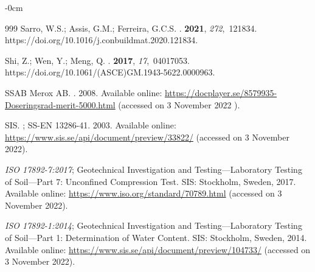 \documentclass[materials,article,accept,pdftex,moreauthors]{Definitions/mdpi}
\begin{document}
\begin{adjustwidth}{-\extralength}{0cm}
\begin{thebibliography}{999}
Sarro, W.S.; Assis, G.M.; Ferreira, G.C.S.
.
 {\bf 2021}, {\em
  272},~121834. https://doi.org/10.1016/j.conbuildmat.2020.121834.

Shi, Z.; Wen, Y.; Meng, Q.
.
 {\bf 2017}, {\em
  17},~04017053. https://doi.org/10.1061/(ASCE)GM.1943-5622.0000963.

{SSAB Merox AB}.
. 2008.
\newblock Available online:  \url{https://docplayer.se/8579935-Doseringsrad-merit-5000.html}  (accessed on 3 November 2022 %
).

SIS.
; SS-EN 13286-41. 2003. 
\newblock Available online:  \url{https://www.sis.se/api/document/preview/33822/} (accessed on 3 November 2022).

\emph{ISO 17892-7:2017}; Geotechnical Investigation and Testing---Laboratory Testing of Soil---Part 7: Unconfined Compression Test. {SIS:  Stockholm, Sweden}, 2017. 
\newblock Available online: \url{https://www.iso.org/standard/70789.html} (accessed on 3 November 2022).

\emph{ISO 17892-1:2014}; Geotechnical Investigation and Testing---Laboratory Testing of Soil---Part 1: Determination of Water Content. {SIS:  Stockholm, Sweden}, 2014. Available online: \url{https://www.sis.se/api/document/preview/104733/} (accessed on 3 November 2022).
 


\end{thebibliography}
\end{adjustwidth}
\end{document}
